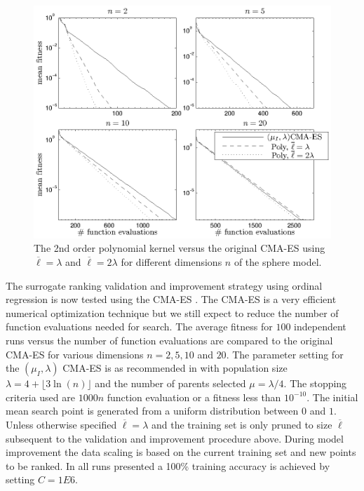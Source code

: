 \documentclass[10pt]{llncs}
\begin{document}
\begin{figure}[t!]
\centering
\includegraphics[width=0.8\columnwidth]{figs/sphere_2.eps}
\caption{The 2nd order polynomial kernel versus the original
  CMA-ES using $\overline{\ell}=\lambda$ and
  $\overline{\ell}=2\lambda$ for different dimensions $n$ of the sphere model.}
\label{fig:sphere2}
\end{figure}


The surrogate ranking validation and improvement strategy using
ordinal regression is now tested using the CMA-ES
\cite{hansen:ostermeier:01}. The CMA-ES is a very efficient
numerical optimization technique but we still expect to reduce
the number of function evaluations needed for search. The
average fitness for $100$ independent runs versus the number of
function evaluations are compared to the original CMA-ES for
various dimensions $n=2,5,10$ and $20$. The parameter setting
for the $(\mu_I,\lambda)$ CMA-ES is as recommended in
\cite{hansen:ostermeier:01} with population size $\lambda =
4+\lfloor 3\ln(n)\rfloor$ and the number of parents selected
$\mu=\lambda/4$. The stopping criteria used are $1000n$ function
evaluation or a fitness less than $10^{-10}$. The initial
mean search point is generated from a uniform distribution
between $0$ and $1$. Unless otherwise specified $\overline{\ell}
= \lambda$ and the training set is only pruned to size
$\overline{\ell}$ subsequent to the validation and improvement
procedure above. During model improvement the data scaling is
based on the current training set and new points to be ranked.
In all runs presented a 100\% training accuracy is achieved by
setting $C=1E6$.
\end{document}
